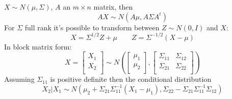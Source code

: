 \documentclass[10pt, twocolumn]{article}
\begin{document}
$X \sim N(\mu, \Sigma)$, $A$ an $m \times n$ matrix,
then 
\[
    AX \sim N(A \mu, A \Sigma A^t)
\]
For $\Sigma$ full rank it's possible to transform between $Z \sim
N(0, I)$ and $X$:
\[
    X = \Sigma^{1/2} Z + \mu \qquad Z = \Sigma^{-1/2} (X - \mu)
\]
In block matrix form:
\[
    X =
    \begin{bmatrix}
        X_1 \\
        X_2 \\
    \end{bmatrix}
    \sim N \left(
    \begin{bmatrix}
        \mu_1 \\
        \mu_2 \\
    \end{bmatrix}
    ,
    \begin{bmatrix}
        \Sigma_{11} & \Sigma_{12} \\
        \Sigma_{21} & \Sigma_{22} \\
    \end{bmatrix}
\right)
\]
Assuming $\Sigma_{11}$ is positive definite then the conditional
distribution
\[
    X_2 | X_1 \sim N(\mu_2 + \Sigma_{21} \Sigma_{11}^{-1} (X_1 - \mu_1),
    \Sigma_{22} - \Sigma_{21} \Sigma_{11}^{-1} \Sigma_{12})
\]

\newpage
\end{document}
